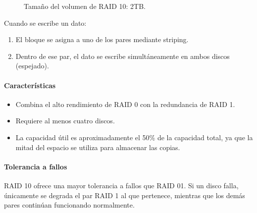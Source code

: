 \begin{figure}[!ht]
  \caption{Tamaño del volumen de RAID 10: 2TB.}
  \label{fig:raid10}
\end{figure}

Cuando se escribe un dato:
\begin{enumerate}
  \item El bloque se asigna a uno de los pares mediante striping.
  \item Dentro de ese par, el dato se escribe simultáneamente en ambos discos (espejado).
\end{enumerate}

\paragraph{Características}
\begin{itemize}
  \item Combina el alto rendimiento de RAID 0 con la redundancia de RAID 1.
  \item Requiere al menos cuatro discos.
  \item La capacidad útil es aproximadamente el 50\% de la capacidad total, ya que la mitad del espacio se utiliza para almacenar las copias.
\end{itemize}

\paragraph{Tolerancia a fallos}

RAID 10 ofrece una mayor tolerancia a fallos que RAID 01. Si un disco falla, únicamente se degrada el par RAID 1 al que pertenece, mientras que los demás pares continúan funcionando normalmente.

